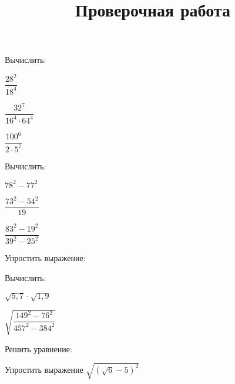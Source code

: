 \newpage
\title{Проверочная работа}
\begin{listofex}
	\item Вычислить:
	\begin{enumcols}[itemcolumns=3]
		\item \( \dfrac{28^2}{18^4} \)
		\item \( \dfrac{32^7}{16^4\cdot64^4} \)
		\item \( \dfrac{100^6}{2\cdot5^{7}} \)
	\end{enumcols}
	\item Вычислить:
	\begin{enumcols}[itemcolumns=3]
		\item \( 78^2-77^2 \)
		\item \( \dfrac{73^2-54^2}{19} \)
		\item \( \dfrac{83^2-19^2}{39^2-25^2} \)
	\end{enumcols}
	\item Упростить выражение:
	\begin{enumcols}[itemcolumns=2]
		\item {}
		\item {}
	\end{enumcols}
	\item Вычислить:
	\begin{enumcols}[itemcolumns=3]
		\item \( \sqrt{5,7}\cdot\sqrt{1,9} \)
		\item \( \sqrt{\dfrac{149^2-76^2}{457^2-384^2}} \)
		\item {}
	\end{enumcols}
	\item Решить уравнение:
	\begin{enumcols}[itemcolumns=2]
		\item {}
		\item {}
		\item {}
		\item {}
	\end{enumcols}
	\item {}
	\item Упростить выражение \( \sqrt{(\sqrt{6}-5)^2} \)
\end{listofex}